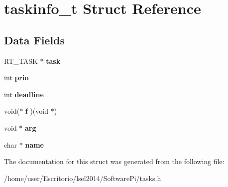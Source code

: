 \hypertarget{structtaskinfo__t}{\section{taskinfo\-\_\-t \-Struct \-Reference}
\label{structtaskinfo__t}
}
\subsection*{\-Data \-Fields}
\begin{DoxyCompactItemize}
\item 
\hypertarget{structtaskinfo__t_a0cb1f1c02a99ef3f44badfca22e514e6}{\-R\-T\-\_\-\-T\-A\-S\-K $\ast$ {\bfseries task}}\label{structtaskinfo__t_a0cb1f1c02a99ef3f44badfca22e514e6}

\item 
\hypertarget{structtaskinfo__t_a1e9ebd8d44c3cc311783dd655f63fa4e}{int {\bfseries prio}}\label{structtaskinfo__t_a1e9ebd8d44c3cc311783dd655f63fa4e}

\item 
\hypertarget{structtaskinfo__t_a73210d575d02627afb5bb5c576dd16fe}{int {\bfseries deadline}}\label{structtaskinfo__t_a73210d575d02627afb5bb5c576dd16fe}

\item 
\hypertarget{structtaskinfo__t_a7f8bb634684703736143ef904715981d}{void($\ast$ {\bfseries f} )(void $\ast$)}\label{structtaskinfo__t_a7f8bb634684703736143ef904715981d}

\item 
\hypertarget{structtaskinfo__t_a31543d6535122611f920b2e113c2df4d}{void $\ast$ {\bfseries arg}}\label{structtaskinfo__t_a31543d6535122611f920b2e113c2df4d}

\item 
\hypertarget{structtaskinfo__t_a193ca0526c879aefa073279d7ca9f32c}{char $\ast$ {\bfseries name}}\label{structtaskinfo__t_a193ca0526c879aefa073279d7ca9f32c}

\end{DoxyCompactItemize}


\-The documentation for this struct was generated from the following file\-:\begin{DoxyCompactItemize}
\item 
/home/user/\-Escritorio/lsel2014/\-Software\-Pi/tasks.\-h\end{DoxyCompactItemize}
